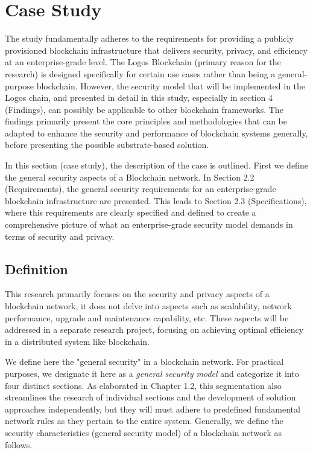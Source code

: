 \section{Case Study}
The study fundamentally adheres to the requirements for providing a publicly provisioned blockchain infrastructure that delivers security, privacy, and efficiency at an enterprise-grade level. The Logos Blockchain (primary reason for the research) is designed specifically for certain use cases rather than being a general-purpose blockchain. However, the security model that will be implemented in the Logos chain, and presented in detail in this study, especially in section 4 (Findings), can possibly be applicable to other blockchain frameworks. The findings primarily present the core principles and methodologies that can be adapted to enhance the security and performance of blockchain systems generally, before presenting the possible substrate-based solution.

In this section (case study), the description of the case is outlined. First we define the general security aspects of a Blockchain network. In Section 2.2 (Requirements), the general security requirements for an enterprise-grade blockchain infrastructure are presented. This leads to Section 2.3 (Specifications), where this requirements are clearly specified and defined to create a comprehensive picture of what an enterprise-grade security model demands in terms of security and privacy.

\subsection{Definition}
This research primarily focuses on the security and privacy aspects of a blockchain network\cite{block_secure_blog}, it does not delve into aspects such as scalability, network performance, upgrade and maintenance capability, etc. These aspects will be addressed in a separate research project, focusing on achieving optimal efficiency in a distributed system like blockchain.

We define here the "general security" in a blockchain network. For practical purposes, we designate it here as a \textit{general security model} and categorize it into four distinct sections. As elaborated in Chapter 1.2, this segmentation also streamlines the research of individual sections and the development of solution approaches independently, but they will must adhere to predefined fundamental network rules as they pertain to the entire system. Generally, we define the security characteristics (general security model) of a blockchain network as follows.


